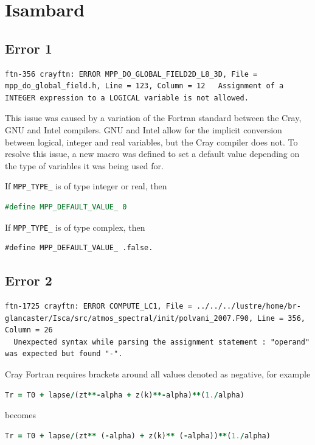 \documentclass[a4paper,11pt]{report}
\newcommand{\toclesssection}[1]{\section{#1}\addtocounter{section}{1}}
\begin{document}
\toclesssection{Isambard}
\subsection{Error 1}

\begin{lstlisting}
ftn-356 crayftn: ERROR MPP_DO_GLOBAL_FIELD2D_L8_3D, File = mpp_do_global_field.h, Line = 123, Column = 12   Assignment of a INTEGER expression to a LOGICAL variable is not allowed.
\end{lstlisting}
This issue was caused by a variation of the Fortran standard between the Cray, GNU and Intel compilers. GNU and Intel allow for the implicit conversion between logical, integer and real variables, but the Cray compiler does not. To resolve this issue, a new macro was defined to set a default value depending on the type of variables it was being used for. 
\par
If \texttt{MPP\_TYPE\_} is of type integer or real, then 
\begin{lstlisting}[language=Fortran]
#define MPP_DEFAULT_VALUE_ 0
\end{lstlisting}
\par
If \texttt{MPP\_TYPE\_} is of type complex, then 
\begin{lstlisting}
#define MPP_DEFAULT_VALUE_ .false.
\end{lstlisting}

\subsection{Error 2}

\begin{lstlisting}
ftn-1725 crayftn: ERROR COMPUTE_LC1, File = ../../../lustre/home/br-glancaster/Isca/src/atmos_spectral/init/polvani_2007.F90, Line = 356, Column = 26 
  Unexpected syntax while parsing the assignment statement : "operand" was expected but found "-".
\end{lstlisting}
Cray Fortran requires brackets around all values denoted as negative, for example
\begin{lstlisting}[language=Fortran]
Tr = T0 + lapse/(zt**-alpha + z(k)**-alpha)**(1./alpha)
\end{lstlisting}
becomes 
\begin{lstlisting}[language=Fortran]
Tr = T0 + lapse/(zt** (-alpha) + z(k)** (-alpha))**(1./alpha)
\end{lstlisting}
\end{document}

